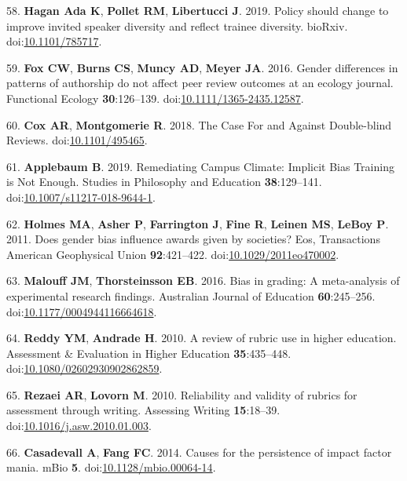 \documentclass[11pt,]{article}
\begin{document}
\hypertarget{ref-Hagan_2019}{}
58. \textbf{Hagan \textnormal{Ada K}}, \textbf{Pollet RM},
\textbf{Libertucci J}. 2019. Policy should change to improve invited
speaker diversity and reflect trainee diversity. bioRxiv.
doi:\href{https://doi.org/10.1101/785717}{10.1101/785717}.

\hypertarget{ref-fox_gender_2016}{}
59. \textbf{Fox CW}, \textbf{Burns CS}, \textbf{Muncy AD}, \textbf{Meyer
JA}. 2016. Gender differences in patterns of authorship do not affect
peer review outcomes at an ecology journal. Functional Ecology
\textbf{30}:126--139.
doi:\href{https://doi.org/10.1111/1365-2435.12587}{10.1111/1365-2435.12587}.

\hypertarget{ref-cox_case_2018}{}
60. \textbf{Cox AR}, \textbf{Montgomerie R}. 2018. The Case For and
Against Double-blind Reviews.
doi:\href{https://doi.org/10.1101/495465}{10.1101/495465}.

\hypertarget{ref-applebaum_remediating_2019}{}
61. \textbf{Applebaum B}. 2019. Remediating Campus Climate: Implicit
Bias Training is Not Enough. Studies in Philosophy and Education
\textbf{38}:129--141.
doi:\href{https://doi.org/10.1007/s11217-018-9644-1}{10.1007/s11217-018-9644-1}.

\hypertarget{ref-Holmes2011}{}
62. \textbf{Holmes MA}, \textbf{Asher P}, \textbf{Farrington J},
\textbf{Fine R}, \textbf{Leinen MS}, \textbf{LeBoy P}. 2011. Does gender
bias influence awards given by societies? Eos, Transactions American
Geophysical Union \textbf{92}:421--422.
doi:\href{https://doi.org/10.1029/2011eo470002}{10.1029/2011eo470002}.

\hypertarget{ref-Malouff2016}{}
63. \textbf{Malouff JM}, \textbf{Thorsteinsson EB}. 2016. Bias in
grading: A meta-analysis of experimental research findings. Australian
Journal of Education \textbf{60}:245--256.
doi:\href{https://doi.org/10.1177/0004944116664618}{10.1177/0004944116664618}.

\hypertarget{ref-Reddy2010}{}
64. \textbf{Reddy YM}, \textbf{Andrade H}. 2010. A review of rubric use
in higher education. Assessment \& Evaluation in Higher Education
\textbf{35}:435--448.
doi:\href{https://doi.org/10.1080/02602930902862859}{10.1080/02602930902862859}.

\hypertarget{ref-Rezaei2010}{}
65. \textbf{Rezaei AR}, \textbf{Lovorn M}. 2010. Reliability and
validity of rubrics for assessment through writing. Assessing Writing
\textbf{15}:18--39.
doi:\href{https://doi.org/10.1016/j.asw.2010.01.003}{10.1016/j.asw.2010.01.003}.

\hypertarget{ref-Casadevall2014}{}
66. \textbf{Casadevall A}, \textbf{Fang FC}. 2014. Causes for the
persistence of impact factor mania. mBio \textbf{5}.
doi:\href{https://doi.org/10.1128/mbio.00064-14}{10.1128/mbio.00064-14}.
\end{document}
